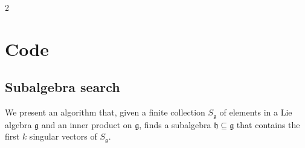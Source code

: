 \documentclass{article}
\newtheorem{theorem}{Theorem}[section]
\newcommand{\M}{\mathcal{M}}                                %
\newcommand{\g}{\mathfrak{g}}                               %
\newcommand{\state}{x}
\begin{document}
\begin{multicols}{2}



\section{Code}\label{ssec:appendix-code}
\subsection{Subalgebra search}\label{ssec:code-subalgebra}
We present an algorithm that, given a finite collection $S_\g$ of elements in a Lie algebra $\g$ and an inner product on $\g$, finds a subalgebra $\mathfrak{h} \subseteq \g$ that contains the first $k$ singular vectors of $S_\g$.


\end{multicols}
\end{document}
